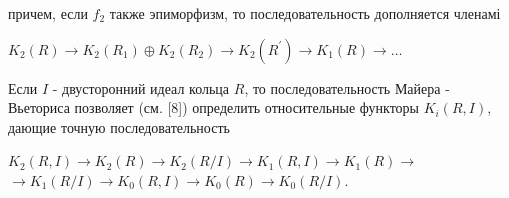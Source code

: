 \documentclass[10pt]{article}
\begin{document}
причем, если $f_{2}$ также эпиморфизм, то последовательность дополняется членамі



$K_{2}(R) \longrightarrow K_{2}\left(R_{1}\right) \oplus K_{2}\left(R_{2}\right) \longrightarrow K_{2}\left(R^{\prime}\right) \longrightarrow K_{1}(R) \longrightarrow \ldots$



Если $I$ - двусторонний идеал кольца $R$, то последовательность Майера - Вьеториса позволяет (см. [8]) определить относительные функторы $K_{i}(R, I)$, дающие точную последовательность



$K_{2}(R, I) \longrightarrow K_{2}(R) \longrightarrow K_{2}(R / I) \longrightarrow K_{1}(R, I) \longrightarrow K_{1}(R) \longrightarrow$ $\longrightarrow K_{1}(R / I) \longrightarrow K_{0}(R, I) \longrightarrow K_{0}(R) \longrightarrow K_{0}(R / I)$.
\end{document}
